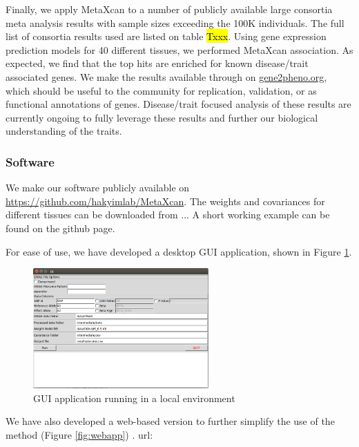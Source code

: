 \documentclass[10pt]{article}
\begin{document}
Finally, we apply MetaXcan to a number of publicly available large consortia meta analysis results with sample sizes exceeding the 100K individuals. The full list of consortia results used are listed on table \hl{Txxx}. Using gene expression prediction models for 40 different tissues, we performed MetaXcan association. As expected, we find that the top hits are enriched for known disease/trait associated genes. We make the results available through on \url{gene2pheno.org}, which should be useful to the community for replication, validation, or as functional annotations of genes. Disease/trait focused analysis of these results are currently ongoing to fully leverage these results and further our biological understanding of the traits.
%
%
%

\subsubsection*{Software}

We make our software publicly available on \url{https://github.com/hakyimlab/MetaXcan}. The weights and covariances for different tissues can be downloaded from ...
A short working example can be found on the github page. 

For ease of use, we have developed a desktop GUI application, shown in Figure \ref{fig:gui}.

\begin{figure}
\includegraphics[width=0.6\textwidth]{plots/gui.png}
\caption{ GUI application running in a local environment}
\label{fig:gui}
\end{figure}

We have also developed a web-based version to further simplify the use of the method (Figure \ref{fig:webapp}) . url:
\end{document}
